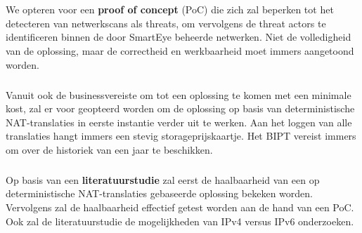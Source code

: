 
\chapter{}%
\label{ch:methodologie}


We opteren voor een \textbf{proof of concept} (PoC) die zich zal beperken tot het detecteren van netwerkscans als threats, om vervolgens de threat actors te identificeren binnen de door SmartEye beheerde netwerken. Niet de volledigheid van de oplossing, maar de correctheid en werkbaarheid moet immers aangetoond worden.

\paragraph{}
Vanuit ook de businessvereiste om tot een oplossing te komen met een minimale kost, zal er voor geopteerd worden om de oplossing op basis van deterministische NAT-translaties in eerste instantie verder uit te werken. Aan het loggen van alle translaties hangt immers een stevig storageprijskaartje. Het BIPT vereist immers om over de historiek van een jaar te beschikken.

\paragraph{}
Op basis van een \textbf{literatuurstudie} zal eerst de haalbaarheid van een op deterministische NAT-translaties gebaseerde oplossing bekeken worden. Vervolgens zal de haalbaarheid effectief getest worden aan de hand van een PoC. Ook zal de literatuurstudie de mogelijkheden van IPv4 versus IPv6 onderzoeken.

